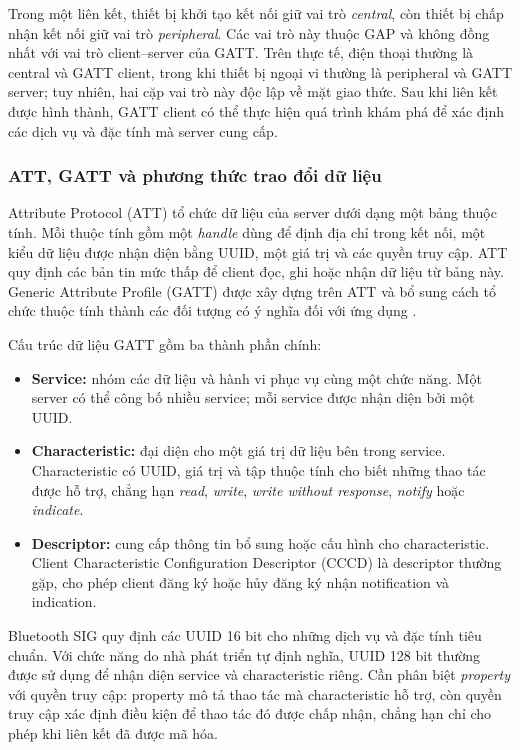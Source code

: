 Trong một liên kết, thiết bị khởi tạo kết nối giữ vai trò \textit{central}, còn thiết bị chấp nhận kết nối giữ vai trò \textit{peripheral}. Các vai trò này thuộc GAP và không đồng nhất với vai trò client--server của GATT. Trên thực tế, điện thoại thường là central và GATT client, trong khi thiết bị ngoại vi thường là peripheral và GATT server; tuy nhiên, hai cặp vai trò này độc lập về mặt giao thức. Sau khi liên kết được hình thành, GATT client có thể thực hiện quá trình khám phá để xác định các dịch vụ và đặc tính mà server cung cấp.

\subsubsection{ATT, GATT và phương thức trao đổi dữ liệu}

Attribute Protocol (ATT) tổ chức dữ liệu của server dưới dạng một bảng thuộc tính. Mỗi thuộc tính gồm một \textit{handle} dùng để định địa chỉ trong kết nối, một kiểu dữ liệu được nhận diện bằng UUID, một giá trị và các quyền truy cập. ATT quy định các bản tin mức thấp để client đọc, ghi hoặc nhận dữ liệu từ bảng này. Generic Attribute Profile (GATT) được xây dựng trên ATT và bổ sung cách tổ chức thuộc tính thành các đối tượng có ý nghĩa đối với ứng dụng .

Cấu trúc dữ liệu GATT gồm ba thành phần chính:

\begin{itemize}
    \item \textbf{Service:} nhóm các dữ liệu và hành vi phục vụ cùng một chức năng. Một server có thể công bố nhiều service; mỗi service được nhận diện bởi một UUID.

    \item \textbf{Characteristic:} đại diện cho một giá trị dữ liệu bên trong service. Characteristic có UUID, giá trị và tập thuộc tính cho biết những thao tác được hỗ trợ, chẳng hạn \textit{read}, \textit{write}, \textit{write without response}, \textit{notify} hoặc \textit{indicate}.

    \item \textbf{Descriptor:} cung cấp thông tin bổ sung hoặc cấu hình cho characteristic. Client Characteristic Configuration Descriptor (CCCD) là descriptor thường gặp, cho phép client đăng ký hoặc hủy đăng ký nhận notification và indication.
\end{itemize}

Bluetooth SIG quy định các UUID 16 bit cho những dịch vụ và đặc tính tiêu chuẩn. Với chức năng do nhà phát triển tự định nghĩa, UUID 128 bit thường được sử dụng để nhận diện service và characteristic riêng. Cần phân biệt \textit{property} với quyền truy cập: property mô tả thao tác mà characteristic hỗ trợ, còn quyền truy cập xác định điều kiện để thao tác đó được chấp nhận, chẳng hạn chỉ cho phép khi liên kết đã được mã hóa.

